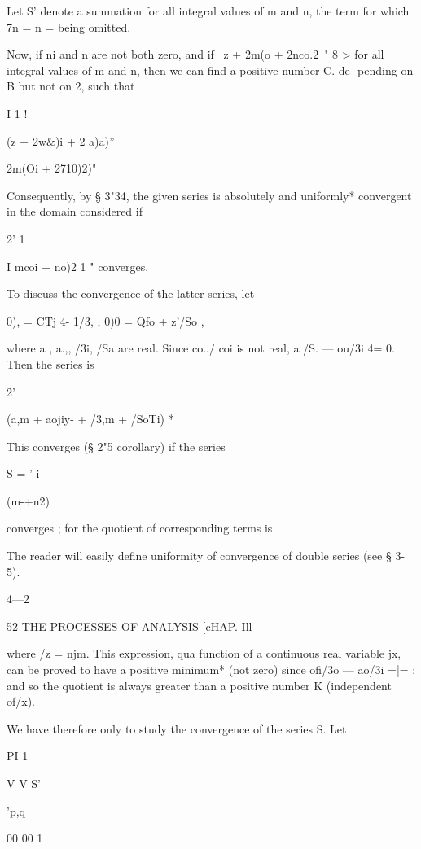 Let S' denote a summation for all integral values of m and n, the term
for which 7n = n = being omitted.

Now, if ni and n are not both zero, and if \ z + 2m(o + 2nco.2\ " 8 >
for all integral values of m and n, then we can find a positive number
C. de- pending on B but not on 2, such that

I 1 !



(z + 2w\&)i + 2 a)a)''



 2m(Oi + 2710)2)"



Consequently, by § 3"34, the given series is absolutely and uniformly*
convergent in the domain considered if

2' 1

I mcoi + no)2 1 " converges.

To discuss the convergence of the latter series, let

0), = CTj 4- 1/3, , 0)0 = Qfo + z'/So ,

where a , a.,, /3i, /Sa are real. Since co../ coi is not real, a /S. —
ou/3i 4= 0. Then the series is

2'

 (a,m + aojiy- + /3,m + /SoTi) *

This converges (§ 2"5 corollary) if the series

S = ' i — -

(m-+n2)

converges ; for the quotient of corresponding terms is

The reader will easily define uniformity of convergence of double
series (see § 3-5).

4—2



52 THE PROCESSES OF ANALYSIS [cHAP. Ill

where /z = njm. This expression, qua function of a continuous real
variable jx, can be proved to have a positive minimum* (not zero)
since ofi/3o — ao/3i =|= ; and so the quotient is always greater than
a positive number K (independent of/x).

We have therefore only to study the convergence of the series S. Let

PI 1

V V S'



 'p,q



00 00 1

